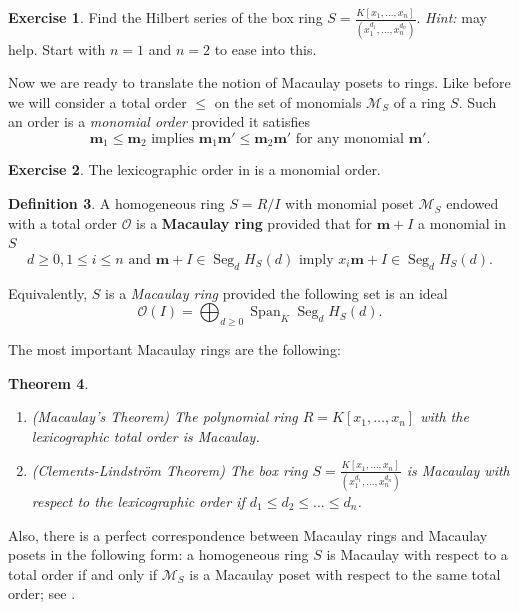 \documentclass[11pt]{amsart}
\newcommand{\M}{{\mathcal M}}
\renewcommand{\O}{{\mathcal O}}
\def\Span{\operatorname{Span}}
\def\bm{\mathbf{m}}
\def\Seg{\operatorname{Seg}}
\theoremstyle{plain} %
\newtheorem{thm}{Theorem}[section]
\theoremstyle{definition}
\newtheorem{defn}[thm]{Definition}
\newtheorem{exer}[thm]{Exercise}
\theoremstyle{remark}
\numberwithin{equation}{section}  %
\begin{document}
\begin{tcolorbox}[reset]
\begin{exer}
Find the Hilbert series of the box ring $S=\frac{K[x_1,\ldots, x_n]}{(x_1^{d_1}, \ldots, x_n^{d_n})}$. {\em Hint:}  may help. Start with $n=1$ and $n=2$ to ease into this.
\end{exer}
\end{tcolorbox}

Now we are ready to translate the notion of Macaulay posets to rings. Like before we will consider a total order $\leq$ on the set of monomials $\M_S$ of a ring $S$. Such an order is a {\em monomial order} provided it satisfies
\[
\bm_1\leq \bm_2 \text{ implies } \bm_1 \bm'\leq \bm_2\bm' \text{ for any monomial } \bm'.
\]

\begin{tcolorbox}[reset]
\begin{exer}
The lexicographic order in  is a monomial order.
\end{exer}
\end{tcolorbox}

\begin{tcolorbox}
\begin{defn}
A homogeneous ring $S=R/I$ with monomial poset $\M_S$ endowed with a total order $\O$ is a {\bf Macaulay ring} provided that for $\bm+I$ a monomial in $S$
\[
d\geq 0, 1\leq i\leq n \text{ and } \bm+I\in \Seg_d H_S(d) \text{ imply } x_i\bm +I \in  \Seg_d H_S(d).
\]
\end{defn}
Equivalently, $S$ is a {\em Macaulay ring} provided the following set is an ideal
\[
\O(I)=\bigoplus_{d\geq 0} \Span_K \Seg_d H_S(d).
\]
\end{tcolorbox}

The most important Macaulay rings are the following:
\begin{thm}
\begin{enumerate}
\item (Macaulay's Theorem) The polynomial ring $R=K[x_1,\ldots, x_n]$ with the  lexicographic total order is Macaulay.
\item (Clements-Lindstr\"om Theorem) The box ring    $S=\frac{K[x_1,\ldots, x_n]}{(x_1^{d_1}, \ldots, x_n^{d_n})}$ is Macaulay with respect to the lexicographic order  if $d_1\leq d_2\leq \ldots \leq d_n$.
\end{enumerate}
\end{thm}

Also, there is a perfect correspondence between Macaulay rings and Macaulay posets in the following form: a homogeneous ring $S$ is Macaulay with respect to a total order  if and only if $\M_S$ is a Macaulay poset with respect to the same total order; see \cite[Theorem 2.6.3]{Nik}.
\end{document}
